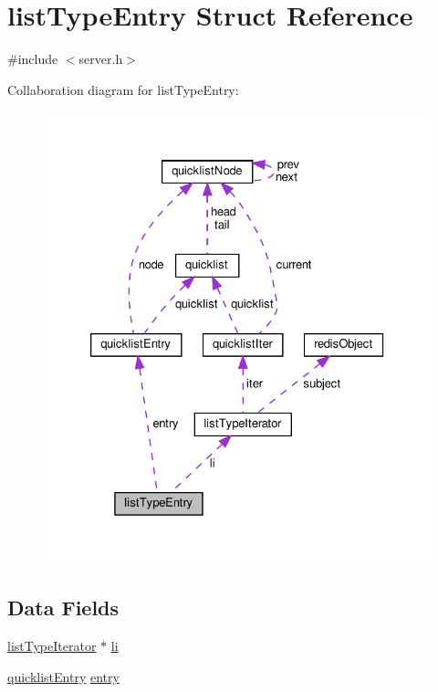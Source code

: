 \hypertarget{structlist_type_entry}{}\section{list\+Type\+Entry Struct Reference}
\label{structlist_type_entry}


{\ttfamily \#include $<$server.\+h$>$}



Collaboration diagram for list\+Type\+Entry\+:
\nopagebreak
\begin{figure}[H]
\begin{center}
\leavevmode
\includegraphics[width=326pt]{structlist_type_entry__coll__graph}
\end{center}
\end{figure}
\subsection*{Data Fields}
\begin{DoxyCompactItemize}
\item 
\hyperlink{structlist_type_iterator}{list\+Type\+Iterator} $\ast$ \hyperlink{structlist_type_entry_a3d40727d2b97a1eee7c2775aa8ec35c6}{li}
\item 
\hyperlink{structquicklist_entry}{quicklist\+Entry} \hyperlink{structlist_type_entry_aca59553f4ef8969fab89ee54734cc60b}{entry}
\end{DoxyCompactItemize}


